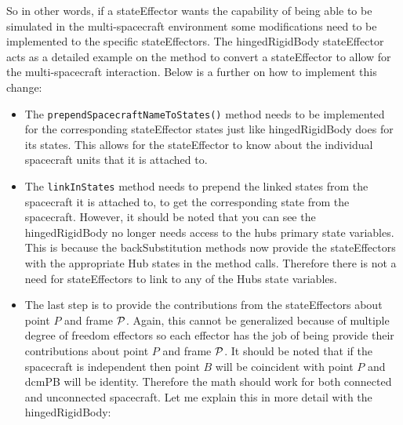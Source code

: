 \begin{itemize}
	So in other words, if a stateEffector wants the capability of being able to be simulated in the multi-spacecraft environment some modifications need to be implemented to the specific stateEffectors. The hingedRigidBody stateEffector acts as a detailed example on the method to convert a stateEffector to allow for the multi-spacecraft interaction. Below is a further on how to implement this change:
	\begin{itemize}
		\item The {\tt prependSpacecraftNameToStates()} method needs to be implemented for the corresponding stateEffector states just like hingedRigidBody does for its states. This allows for the stateEffector to know about the individual spacecraft units that it is attached to.
		\item The {\tt linkInStates} method needs to prepend the linked states from the spacecraft it is attached to, to get the corresponding state from the spacecraft. However, it should be noted that you can see the hingedRigidBody no longer needs access to the hubs primary state variables. This is because the backSubstitution methods now provide the stateEffectors with the appropriate Hub states in the method calls. Therefore there is not a need for stateEffectors to link to any of the Hubs state variables.
		\item The last step is to provide the contributions from the stateEffectors about point $P$ and frame $\cal P$. Again, this cannot be generalized because of multiple degree of freedom effectors so each effector has the job of being provide their contributions about point $P$ and frame $\cal P$. It should be noted that if the spacecraft is independent then point $B$ will be coincident with point $P$ and dcmPB will be identity. Therefore the math should work for both connected and unconnected spacecraft. Let me explain this in more detail with the hingedRigidBody:
		

\end{itemize}
\end{itemize}
